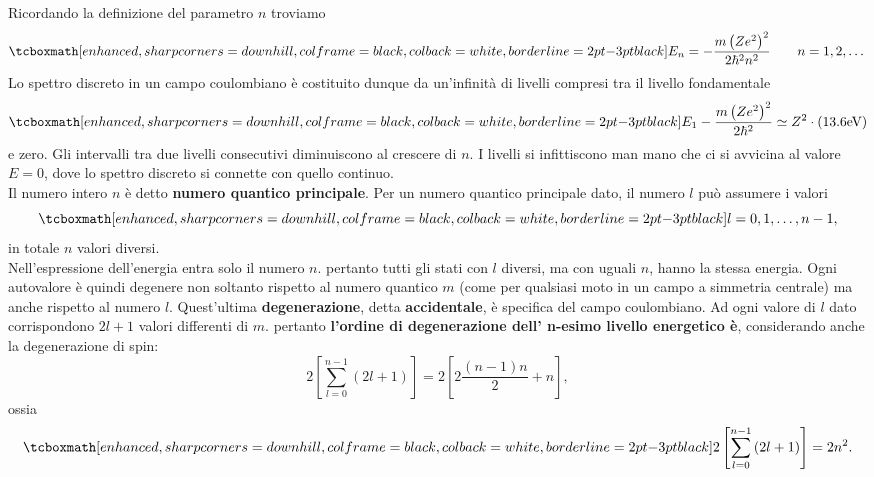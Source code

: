 \documentclass[a4paper,12pt,oneside]{book}
\begin{document}
Ricordando la definizione del parametro $n$ troviamo
	\begin{equation}
		\tcboxmath[enhanced, sharp corners=downhill, colframe=black, colback=white, borderline={2pt}{-3pt}{black}]{
			E_n= -\frac{m\left(Ze^2\right) ^2}{2\hbar ^2 n^2}
			}\qquad n=1,2,\dots
	\end{equation}
Lo spettro discreto in un campo coulombiano è costituito dunque da un'infinità di livelli compresi tra il livello fondamentale
	\begin{equation}
		\tcboxmath[enhanced, sharp corners=downhill, colframe=black, colback=white, borderline={2pt}{-3pt}{black}]{
			E_1-\frac{m\left(Ze^2\right) ^2}{2\hbar ^2 }\simeq Z^2\cdot \left(13.6 \textrm{eV}\right)
			}
	\end{equation}
e zero. Gli intervalli tra due livelli consecutivi diminuiscono al crescere di $n$. I livelli si infittiscono man mano che ci si avvicina al valore $E=0$, dove lo spettro discreto si connette con quello continuo.\\

Il numero intero $n$ è detto \textbf{numero quantico principale}. Per un numero quantico principale dato, il numero $l$ può assumere i valori
	\begin{equation}
		\tcboxmath[enhanced, sharp corners=downhill, colframe=black, colback=white, borderline={2pt}{-3pt}{black}]{
			l=0,1,\dots,n-1,
			}
	\end{equation}
in totale $n$ valori diversi.\\

Nell'espressione dell'energia entra solo il numero $n$. pertanto tutti gli stati con $l$ diversi, ma con uguali $n$, hanno la stessa energia. Ogni autovalore è quindi degenere non soltanto rispetto al numero quantico $m$ (come per qualsiasi moto in un campo a simmetria centrale) ma anche rispetto al numero $l$. Quest'ultima \textbf{degenerazione}, detta \textbf{accidentale}, è specifica del campo coulombiano. Ad ogni valore di $l$ dato corrispondono $2l+1$ valori differenti di $m$. pertanto \textbf{l'ordine di degenerazione dell' n-esimo livello energetico è}, considerando anche la degenerazione di spin:
	\begin{equation}
		2 \left[ \sum _{l=0} ^{n-1} \left(2l+1 \right)\right]=2 \left[ 2\frac{\left( n-1 \right) n}{2}+n\right],
	\end{equation}
ossia
	\begin{equation}
		\tcboxmath[enhanced, sharp corners=downhill, colframe=black, colback=white, borderline={2pt}{-3pt}{black}]{
			2 \left[ \sum _{l=0} ^{n-1} \left(2l+1 \right)\right]= 2n^2.
			}
	\end{equation}\\
	
\end{document}
